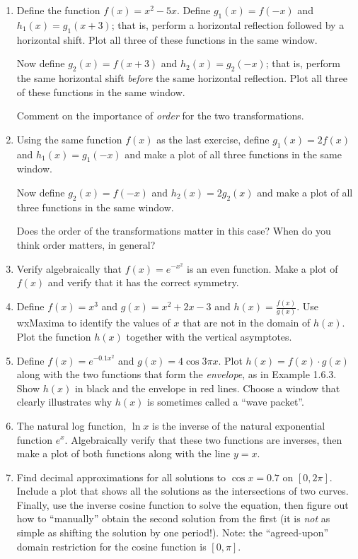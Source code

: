 \documentclass[10.5pt,twoside]{report}
\theoremstyle{definition}
\begin{document}
\begin{enumerate}
\item
Define the function $f(x)=x^2-5x$.  Define $g_1(x)=f(-x)$ and $h_1(x)=g_1(x+3)$; that is, perform a horizontal reflection followed by a horizontal shift.  Plot all three of these functions in the same window.

Now define $g_2(x)=f(x+3)$ and $h_2(x)=g_2(-x)$; that is, perform the same horizontal shift \textit{before} the same horizontal reflection.  Plot all three of these functions in the same window.

Comment on the importance of \textit{order} for the two transformations.

\item
Using the same function $f(x)$ as the last exercise, define $g_1(x)=2f(x)$ and $h_1(x)=g_1(-x)$ and make a plot of all three functions in the same window.

Now define $g_2(x)=f(-x)$ and $h_2(x)=2g_2(x)$ and make a plot of all three functions in the same window.

Does the order of the transformations matter in this case?  When do you think order matters, in general?


\item
Verify algebraically that $f(x)=e^{-x^2}$ is an even function.  Make a plot of $f(x)$ and verify that it has the correct symmetry.

\item
Define $f(x)=x^3$ and $g(x)=x^2+2x-3$ and $h(x)=\frac{f(x)}{g(x)}$.  Use wxMaxima to identify the values of $x$ that are not in the domain of $h(x)$.  Plot the function $h(x)$ together with the vertical asymptotes.

\item
Define $f(x)=e^{-0.1x^2}$ and $g(x)=4\cos{3 \pi x}$.  Plot $h(x)=f(x)\cdot g(x)$ along with the two functions that form the \textit{envelope}, as in Example 1.6.3.  Show $h(x)$ in black and the envelope in red lines.  Choose a window that clearly illustrates why $h(x)$ is sometimes called a ``wave packet''.

\item
The natural log function, $\ln{x}$ is the inverse of the natural exponential function $e^{x}$.  Algebraically verify that these two functions are inverses, then make a plot of both functions along with the line $y=x$.

\item
Find decimal approximations for all solutions to $\cos{x}=0.7$ on $[0,2\pi]$.  Include a plot that shows all the solutions as the intersections of two curves.  Finally, use the inverse cosine function to solve the equation, then figure out how to ``manually'' obtain the second solution from the first (it is \textit{not} as simple as shifting the solution by one period!).  Note:  the ``agreed-upon'' domain restriction for the cosine function is $[0,\pi]$.


\end{enumerate}
\end{document}
